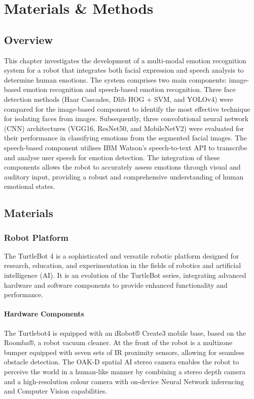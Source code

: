 \chapter{Materials \& Methods}
\section{Overview}

This chapter investigates the development of a multi-modal emotion recognition system for a robot that integrates both facial expression and speech analysis to determine human emotions. The system comprises two main components: image-based emotion recognition and speech-based emotion recognition. Three face detection methods (Haar Cascades, Dlib HOG + SVM, and YOLOv4) were compared for the image-based component to identify the most effective technique for isolating faces from images. Subsequently, three convolutional neural network (CNN) architectures (VGG16, ResNet50, and MobileNetV2) were evaluated for their performance in classifying emotions from the segmented facial images. The speech-based component utilises IBM Watson's speech-to-text API to transcribe and analyse user speech for emotion detection. The integration of these components allows the robot to accurately assess emotions through visual and auditory input, providing a robust and comprehensive understanding of human emotional states.

\section{Materials}

\subsection{Robot Platform}

The TurtleBot 4 is a sophisticated and versatile robotic platform designed for research, education, and experimentation in the fields of robotics and artificial intelligence (AI). It is an evolution of the TurtleBot series, integrating advanced hardware and software components to provide enhanced functionality and performance.

\subsubsection{Hardware Components}
The Turtlebot4 is equipped with an iRobot® Create3 mobile base, based on the Roomba®, a robot vacuum cleaner. At the front of the robot is a multizone bumper equipped with seven sets of IR proximity sensors, allowing for seamless obstacle detection. The OAK-D spatial AI stereo camera enables the robot to perceive the world in a human-like manner by combining a stereo depth camera and a high-resolution colour camera with on-device Neural Network inferencing and Computer Vision capabilities.

